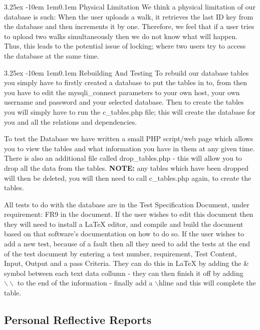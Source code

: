 \documentclass[12pt]{article}
\makeatletter
\renewcommand{\paragraph}{
  \@startsection{paragraph}{4}
  {\z@}{3.25ex \@plus -10em \@minus 1em}{0.1em}
  {\normalfont\normalsize\bfseries}
}
\makeatother
\begin{document}
\paragraph{Physical Limitation}
We think a physical limitation of our database is such: When the user uploads a walk, it retrieves the last ID key from the database and then increments it by one. Therefore, we feel that if a user tries to upload two walks simultaneously then we do not know what will happen. Thus, this leads to the potential issue of locking; where two users try to access the database at the same time.
\paragraph{Rebuilding And Testing}
To rebuild our database tables you simply have to firstly created a database to put the tables in to, from then you have to edit the mysqli\_connect parameters to your own host, your own username and password and your selected database. Then to create the tables you will simply have to run the c\_tables.php file; this will create the database for you and all the relations and dependencies.

To test the Database we have written a small PHP script/web page which allows you to view the tables and what information you have in them at any given time. There is also an additional file called drop\_tables.php - this will allow you to drop all the data from the tables. \textbf{NOTE:} any tables which have been dropped will then be deleted, you will then need to call c\_tables.php again, to create the tables.

All tests to do with the database are in the Test Specification Document, under requirement: FR9 in the document. If the user wishes to edit this document then they will need to install a LaTeX editor,  and compile and build the document based on that software's documentation on how to do so. If the user wishes to add a new test, because of a fault then all they need to add the tests at the end of the test document by entering a test number, requirement, Test Content, Input, Output and a pass Criteria. They can do this in LaTeX by adding the \& symbol between each text data collumn - they can then finish it off by adding $\backslash \backslash$ to the end of the information - finally add a $\backslash$hline and this will complete the table. 
\newpage
\subsection{Personal Reflective Reports}
\end{document}
